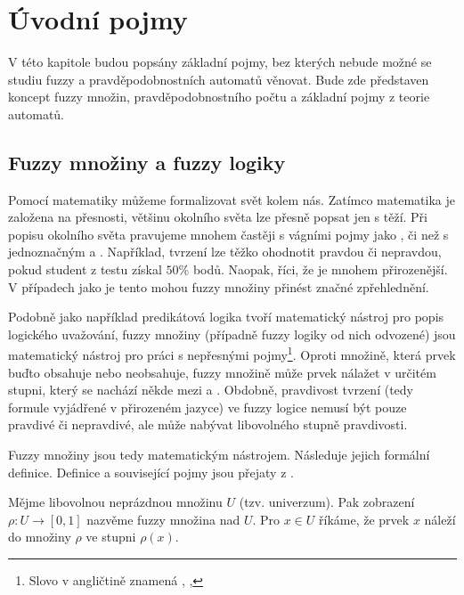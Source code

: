 \section{Úvodní pojmy}
V této kapitole budou popsány základní pojmy, bez kterých nebude možné se studiu fuzzy a pravděpodobnostních automatů věnovat. Bude zde představen koncept fuzzy množin, pravděpodobnostního počtu a základní pojmy z teorie automatů.

\subsection{Fuzzy množiny a fuzzy logiky}
Pomocí matematiky můžeme formalizovat svět kolem nás. Zatímco matematika je založena na přesnosti, většinu okolního světa lze přesně popsat jen s těží. Při popisu okolního světa pravujeme mnohem častěji s vágními pojmy jako ,  či  než s jednoznačným  a . Například, tvrzení  lze těžko ohodnotit pravdou či nepravdou, pokud student z testu získal $50\%$ bodů. Naopak, říci, že  je mnohem přirozenější. V případech jako je tento mohou fuzzy množiny přinést značné zpřehlednění.

Podobně jako například predikátová logika tvoří matematický nástroj pro popis logického uvažování, fuzzy množiny (případně fuzzy logiky od nich odvozené) jsou matematický nástroj pro práci s nepřesnými pojmy\footnote{Slovo  v angličtině znamená , , }. Oproti  množině, která prvek buďto obsahuje nebo neobsahuje, fuzzy množině může prvek nálažet v určitém stupni, který se nachází někde mezi  a . Obdobně, pravdivost tvrzení (tedy formule vyjádřené v přirozeném jazyce) ve fuzzy logice nemusí být pouze pravdivé či nepravdivé, ale může nabývat libovolného stupně pravdivosti.

Fuzzy množiny jsou tedy matematickým nástrojem. Následuje jejich formální definice. Definice a související pojmy jsou přejaty z \cite{Bel-FuzRelSys}.

\begin{definition}
 Mějme libovolnou neprázdnou množinu $U$ (tzv. univerzum). Pak zobrazení $\rho: U \rightarrow [0, 1]$ nazvěme fuzzy množina nad $U$. Pro $x \in U$ říkáme, že prvek $x$ náleží do množiny $\rho$ ve stupni $\rho(x)$.
\end{definition}

